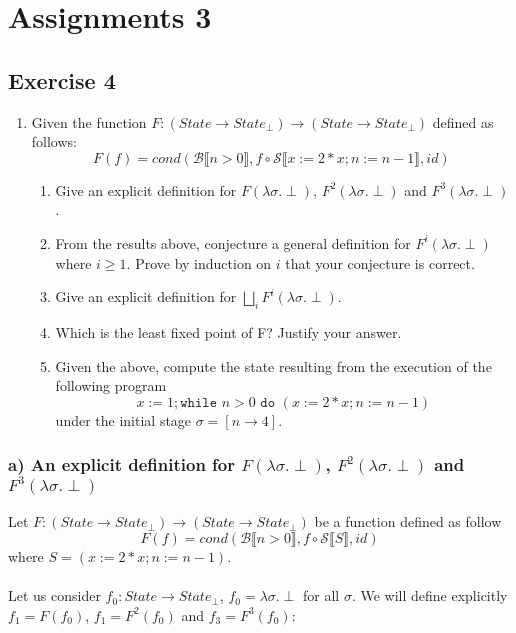 \documentclass{article}
\title{}
\date{}
\author{Rafael Fernández Ortiz}
\newcommand{\while}{\texttt{while $n>0$ do $(x:=2 * x;n:=n-1)$}}
\newcommand{\bcal}{\mathcal{B}}
\newcommand{\scal}{\mathcal{S}}
\newcommand{\bool}[1]{\bcal \llbracket #1 \rrbracket}
\newcommand{\sem}[1]{\scal \llbracket #1 \rrbracket}
\begin{document}
\maketitle

\section*{Assignments 3}
\subsection*{Exercise 4}
\begin{enumerate}
\item[] Given the function $F: (State \rightarrow State_{\perp}) \longrightarrow  (State \rightarrow State_{\perp})$ defined as follows: $$F(f) = cond(\bool{n > 0}, f \circ \sem{x:=2 * x; n:= n-1},id)$$

\begin{enumerate}
    \item Give an explicit definition for $F(\lambda\sigma.\perp)$, $F^2(\lambda\sigma.\perp)$ and $F^3(\lambda\sigma.\perp)$.
    \item From the results above, conjecture a general definition for $F^i(\lambda\sigma.\perp)$ where $i \geq 1$.\;\; \; [Optional] Prove by induction on $i$ that your conjecture is correct.
    \item Give an explicit definition for $\bigsqcup_i F^i(\lambda\sigma.\perp)$.
    \item Which is the least fixed point of F? Justify your answer.
    \item Given the above, compute the state resulting from the execution of the following program $$x:=1;\while$$ under the initial stage $\sigma = [n \rightarrow 4]$.
\end{enumerate}
\end{enumerate}
\subsubsection*{a) An explicit definition for $F(\lambda\sigma.\perp)$, $F^2(\lambda\sigma.\perp)$ and $F^3(\lambda\sigma.\perp)$}
Let $F: (State \rightarrow State_{\perp}) \longrightarrow  (State \rightarrow State_{\perp})$ be a function defined as follow $$F(f) = cond(\bool{n > 0}, f \circ \sem{S},id)$$ where $S = (x:=2 * x; n:= n-1)$.\\\\
Let us consider $f_0: State \longrightarrow State_{\perp}$, $f_0 = \lambda \sigma .\perp$ for all $\sigma$. We will define explicitly  $f_1 = F(f_0)$, $f_1 = F^2(f_0)$ and $f_3 = F^3(f_0)$:\\
\end{document}
